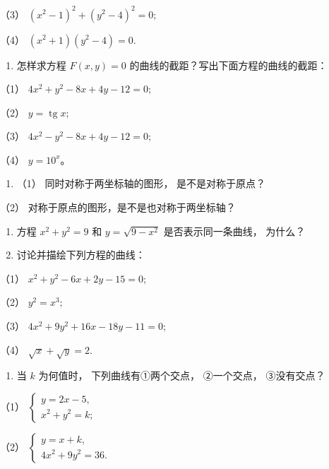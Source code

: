 （3） \((x^{2} - 1)^{2} + (y^{2} - 4)^{2} = 0;\)

（4） \((x^{2} + 1)(y^{2} - 4) = 0.\)

\begin{enumerate}
\def\labelenumi{\arabic{enumi}.}
\setcounter{enumi}{5}
\tightlist
\item
  怎样求方程 \(F(x, y) = 0\) 的曲线的截距？写出下面方程的曲线的截距：
\end{enumerate}

（1） \(4x^{2} + y^{2} - 8x + 4y - 12 = 0;\)

（2） \(y = \operatorname{tg} x;\)

（3） \(4x^{2} - y^{2} - 8x + 4y - 12 = 0;\)

（4） \(y = 10^{x}\)。

\begin{enumerate}
\def\labelenumi{\arabic{enumi}.}
\setcounter{enumi}{6}
\tightlist
\item
  （1） 同时对称于两坐标轴的图形， 是不是对称于原点？
\end{enumerate}

（2） 对称于原点的图形，是不是也对称于两坐标轴？

\begin{enumerate}
\def\labelenumi{\arabic{enumi}.}
\setcounter{enumi}{7}
\item
  方程 \(x^{2} + y^{2} = 9\) 和 \(y = \sqrt{9 - x^{2}}\)
  是否表示同一条曲线， 为什么？
\item
  讨论并描绘下列方程的曲线：
\end{enumerate}

（1） \(x^{2} + y^{2} - 6x + 2y - 15 = 0;\)

（2） \(y^{2}=x^{3};\)

（3） \(4x^{2} + 9y^{2} + 16x - 18y - 11 = 0;\)

（4） \(\sqrt{x} + \sqrt{y} = 2.\)

\begin{enumerate}
\def\labelenumi{\arabic{enumi}.}
\setcounter{enumi}{9}
\tightlist
\item
  当 \(k\) 为何值时， 下列曲线有①两个交点， ②一个交点， ③没有交点？
\end{enumerate}

（1）
\(\left\{ \begin{array}{l} y = 2x - 5, \\ x^2 + y^2 = k; \end{array} \right.\)

（2）
\(\left\{ \begin{array}{l} y = x + k, \\ 4x^2 + 9y^2 = 36. \end{array} \right.\)

